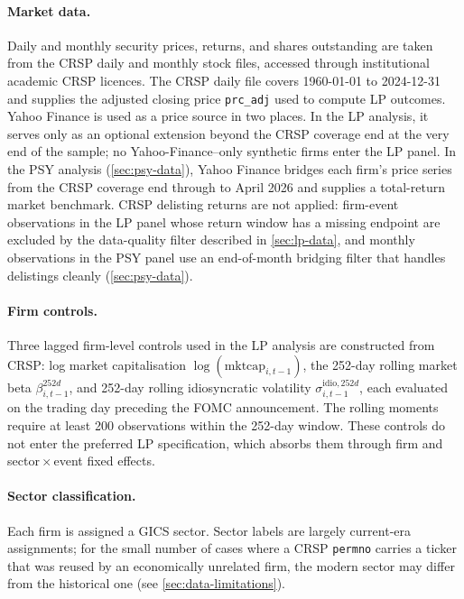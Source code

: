 \paragraph{Market data.} Daily and monthly security prices, returns, and shares outstanding are taken from the CRSP daily and monthly stock files, accessed through institutional academic CRSP licences. The CRSP daily file covers 1960-01-01 to 2024-12-31 and supplies the adjusted closing price \texttt{prc\_adj} used to compute LP outcomes. Yahoo Finance is used as a price source in two places. In the LP analysis, it serves only as an optional extension beyond the CRSP coverage end at the very end of the sample; no Yahoo-Finance--only synthetic firms enter the LP panel. In the PSY analysis (\cref{sec:psy-data}), Yahoo Finance bridges each firm's price series from the CRSP coverage end through to April 2026 and supplies a total-return market benchmark. CRSP delisting returns are not applied: firm-event observations in the LP panel whose return window has a missing endpoint are excluded by the data-quality filter described in \cref{sec:lp-data}, and monthly observations in the PSY panel use an end-of-month bridging filter that handles delistings cleanly (\cref{sec:psy-data}).

\paragraph{Firm controls.} Three lagged firm-level controls used in the LP analysis are constructed from CRSP: log market capitalisation $\log(\text{mktcap}_{i,t-1})$, the 252-day rolling market beta $\beta^{252d}_{i,t-1}$, and 252-day rolling idiosyncratic volatility $\sigma^{\text{idio},252d}_{i,t-1}$, each evaluated on the trading day preceding the FOMC announcement. The rolling moments require at least 200 observations within the 252-day window. These controls do not enter the preferred LP specification, which absorbs them through firm and sector\,$\times$\,event fixed effects.

\paragraph{Sector classification.} Each firm is assigned a GICS sector. Sector labels are largely current-era assignments; for the small number of cases where a CRSP \texttt{permno} carries a ticker that was reused by an economically unrelated firm, the modern sector may differ from the historical one (see \cref{sec:data-limitations}).


